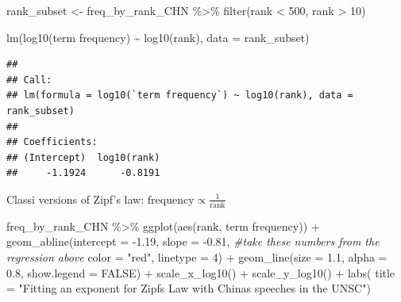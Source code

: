 \documentclass[
]{article}
\newenvironment{Shaded}{\begin{snugshade}}{\end{snugshade}}
\newcommand{\AttributeTok}[1]{\textcolor[rgb]{0.77,0.63,0.00}{#1}}
\newcommand{\CommentTok}[1]{\textcolor[rgb]{0.56,0.35,0.01}{\textit{#1}}}
\newcommand{\ConstantTok}[1]{\textcolor[rgb]{0.00,0.00,0.00}{#1}}
\newcommand{\DecValTok}[1]{\textcolor[rgb]{0.00,0.00,0.81}{#1}}
\newcommand{\FloatTok}[1]{\textcolor[rgb]{0.00,0.00,0.81}{#1}}
\newcommand{\FunctionTok}[1]{\textcolor[rgb]{0.00,0.00,0.00}{#1}}
\newcommand{\NormalTok}[1]{#1}
\newcommand{\OtherTok}[1]{\textcolor[rgb]{0.56,0.35,0.01}{#1}}
\newcommand{\SpecialCharTok}[1]{\textcolor[rgb]{0.00,0.00,0.00}{#1}}
\newcommand{\StringTok}[1]{\textcolor[rgb]{0.31,0.60,0.02}{#1}}
\begin{document}
\begin{Shaded}
\begin{Highlighting}[]
\NormalTok{rank\_subset }\OtherTok{\textless{}{-}}\NormalTok{ freq\_by\_rank\_CHN }\SpecialCharTok{\%\textgreater{}\%} 
  \FunctionTok{filter}\NormalTok{(rank }\SpecialCharTok{\textless{}} \DecValTok{500}\NormalTok{,}
\NormalTok{         rank }\SpecialCharTok{\textgreater{}} \DecValTok{10}\NormalTok{)}

\FunctionTok{lm}\NormalTok{(}\FunctionTok{log10}\NormalTok{(}\StringTok{\textasciigrave{}}\AttributeTok{term frequency}\StringTok{\textasciigrave{}}\NormalTok{) }\SpecialCharTok{\textasciitilde{}} \FunctionTok{log10}\NormalTok{(rank), }\AttributeTok{data =}\NormalTok{ rank\_subset)}
\end{Highlighting}
\end{Shaded}

\begin{verbatim}
## 
## Call:
## lm(formula = log10(`term frequency`) ~ log10(rank), data = rank_subset)
## 
## Coefficients:
## (Intercept)  log10(rank)  
##     -1.1924      -0.8191
\end{verbatim}

Classi versions of Zipf's law:
\(\text{frequency} \propto \frac{1}{\text{rank}}\)

\begin{Shaded}
\begin{Highlighting}[]
\NormalTok{freq\_by\_rank\_CHN }\SpecialCharTok{\%\textgreater{}\%} 
  \FunctionTok{ggplot}\NormalTok{(}\FunctionTok{aes}\NormalTok{(rank, }\StringTok{\textasciigrave{}}\AttributeTok{term frequency}\StringTok{\textasciigrave{}}\NormalTok{)) }\SpecialCharTok{+} 
  \FunctionTok{geom\_abline}\NormalTok{(}\AttributeTok{intercept =} \SpecialCharTok{{-}}\FloatTok{1.19}\NormalTok{, }\AttributeTok{slope =} \SpecialCharTok{{-}}\FloatTok{0.81}\NormalTok{, }\CommentTok{\#take these numbers from the regression above}
              \AttributeTok{color =} \StringTok{"red"}\NormalTok{, }\AttributeTok{linetype =} \DecValTok{4}\NormalTok{) }\SpecialCharTok{+}
  \FunctionTok{geom\_line}\NormalTok{(}\AttributeTok{size =} \FloatTok{1.1}\NormalTok{, }\AttributeTok{alpha =} \FloatTok{0.8}\NormalTok{, }\AttributeTok{show.legend =} \ConstantTok{FALSE}\NormalTok{) }\SpecialCharTok{+} 
  \FunctionTok{scale\_x\_log10}\NormalTok{() }\SpecialCharTok{+}
  \FunctionTok{scale\_y\_log10}\NormalTok{() }\SpecialCharTok{+}
    \FunctionTok{labs}\NormalTok{(}
        \AttributeTok{title =} \StringTok{"Fitting an exponent for Zipf\textquotesingle{}s Law with China\textquotesingle{}s speeches in the UNSC"}\NormalTok{)}
\end{Highlighting}
\end{Shaded}
\end{document}
